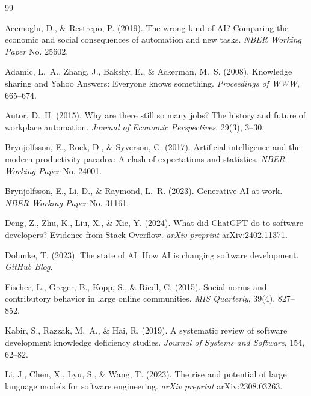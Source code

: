 \documentclass[11pt,a4paper]{article}
\begin{document}
\newpage
\begin{thebibliography}{99}

Acemoglu, D., \& Restrepo, P. (2019). The wrong kind of AI? Comparing the economic and social consequences of automation and new tasks. \textit{NBER Working Paper} No. 25602.

Adamic, L.~A., Zhang, J., Bakshy, E., \& Ackerman, M.~S. (2008). Knowledge sharing and Yahoo Answers: Everyone knows something. \textit{Proceedings of WWW}, 665--674.

Autor, D.~H. (2015). Why are there still so many jobs? The history and future of workplace automation. \textit{Journal of Economic Perspectives}, 29(3), 3--30.

Brynjolfsson, E., Rock, D., \& Syverson, C. (2017). Artificial intelligence and the modern productivity paradox: A clash of expectations and statistics. \textit{NBER Working Paper} No. 24001.

Brynjolfsson, E., Li, D., \& Raymond, L.~R. (2023). Generative AI at work. \textit{NBER Working Paper} No. 31161.

Deng, Z., Zhu, K., Liu, X., \& Xie, Y. (2024). What did ChatGPT do to software developers? Evidence from Stack Overflow. \textit{arXiv preprint} arXiv:2402.11371.

Dohmke, T. (2023). The state of AI: How AI is changing software development. \textit{GitHub Blog}.

Fischer, L., Greger, B., Kopp, S., \& Riedl, C. (2015). Social norms and contributory behavior in large online communities. \textit{MIS Quarterly}, 39(4), 827--852.

Kabir, S., Razzak, M.~A., \& Hai, R. (2019). A systematic review of software development knowledge deficiency studies. \textit{Journal of Systems and Software}, 154, 62--82.

Li, J., Chen, X., Lyu, S., \& Wang, T. (2023). The rise and potential of large language models for software engineering. \textit{arXiv preprint} arXiv:2308.03263.


\end{thebibliography}
\end{document}
